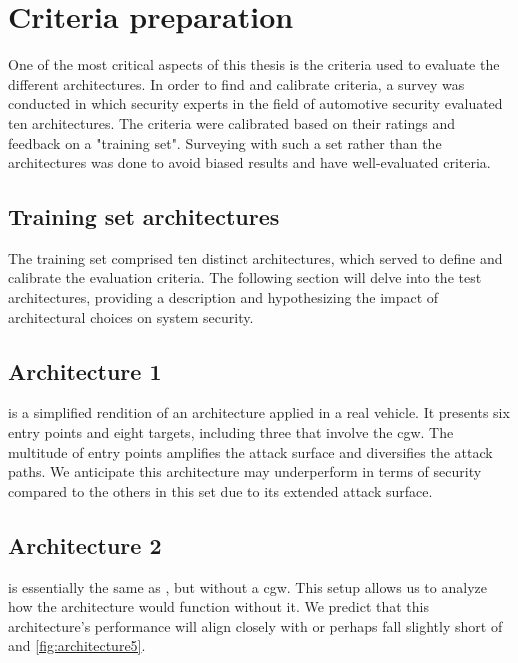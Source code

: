 \chapter{Criteria preparation}
\label{chp:introcriteria}

One of the most critical aspects of this thesis is the criteria used to evaluate the different architectures.
In order to find and calibrate criteria, a survey was conducted in which security experts in the field of automotive security evaluated ten architectures.
The criteria were calibrated based on their ratings and feedback on a "training set".
Surveying with such a set rather than the architectures was done to avoid biased results and have well-evaluated criteria.

\section{Training set architectures}
\label{sec:trainingarch}

The training set comprised ten distinct architectures, which served to define and calibrate the evaluation criteria. 
The following section will delve into the test architectures, 
providing a description and hypothesizing the impact of architectural choices on system security.

\section{Architecture 1}
\label{subsec:arch1}

 is a simplified rendition of an architecture applied in a real vehicle. 
It presents six entry points and eight targets, including three that involve the \acrshort{cgw}. 
The multitude of entry points amplifies the attack surface and diversifies the attack paths. 
We anticipate this architecture may underperform in terms of security compared to the others in this set due to its extended attack surface.

\section{Architecture 2}
\label{subsec:arch2}

 is essentially the same as , 
but without a \acrshort{cgw}.
This setup allows us to analyze how the architecture would function without it. 
We predict that this architecture's performance will align closely with or perhaps 
fall slightly short of  and \ref{fig:architecture5}.

